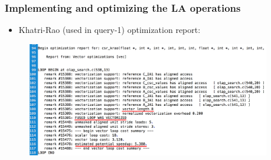 \documentclass{beamer}
\begin{document}
\begin{frame}[fragile]
\frametitle{Implementing and optimizing the LA operations}

\begin{itemize}
    \item Khatri-Rao (used in query-1) optimization report:
\end{itemize}
\begin{figure}
    \centering
    \includegraphics[width=0.95\textwidth,keepaspectratio]{krao_opt.png}
\end{figure}

\end{frame}
\end{document}
